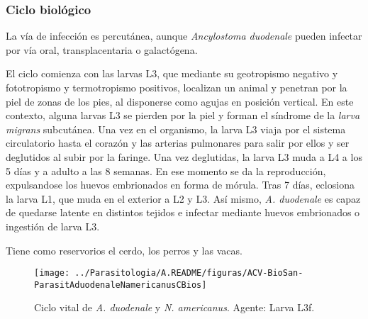 \subsubsection{Ciclo biológico}
La vía de infección es percutánea, aunque \textit{Ancylostoma duodenale} pueden infectar por vía oral, transplacentaria o galactógena.

El ciclo comienza con las larvas L3, que mediante su geotropismo negativo y fototropismo y termotropismo positivos, localizan un animal y penetran por la piel de zonas de los pies, al disponerse como agujas en posición vertical. En este contexto, alguna larvas L3 se pierden por la piel y forman el síndrome de la \textit{larva migrans} subcutánea. Una vez en el organismo, la larva L3 viaja por el sistema circulatorio hasta el corazón y las arterias pulmonares para salir por ellos y ser deglutidos al subir por la faringe. Una vez deglutidas, la larva L3 muda a L4 a los 5 días y a adulto a las 8 semanas. En ese momento se da la reproducción, expulsandose los huevos embrionados en forma de mórula. Tras 7 días, eclosiona la larva L1, que muda en el exterior a L2 y L3. Así mismo, \textit{A. duodenale} es capaz de quedarse latente en distintos tejidos e infectar mediante huevos embrionados o ingestión de larva L3.

Tiene como reservorios el cerdo, los perros y las vacas.
\begin{figure}[H]
	\centering
	\texttt{[image: ../Parasitologia/A.README/figuras/ACV-BioSan-ParasitAduodenaleNamericanusCBios]}
	\caption[Ciclo vital de \textit{A. duodenale} y \textit{N. americanus}]{Ciclo vital de \textit{A. duodenale} y \textit{N. americanus}. Agente: Larva L3f.\label{fig:PARASIT:AduodenaleNamericanusCBios}}
\end{figure}
